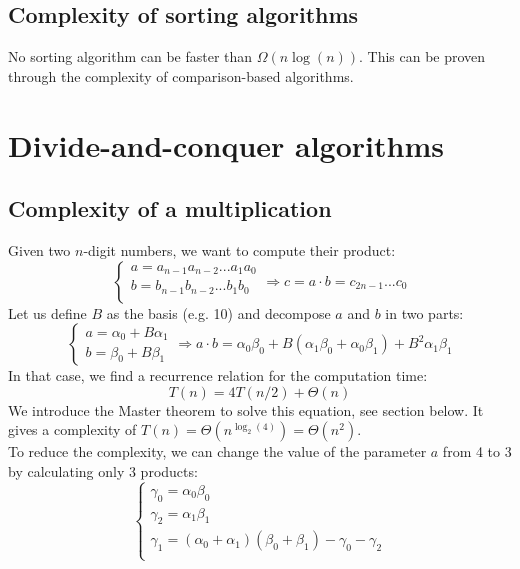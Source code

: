 \documentclass[12pt, openany]{report}
\theoremstyle{definition}
\begin{document}
\section{Complexity of sorting algorithms}
No sorting algorithm can be faster than $\Omega(n \log(n))$. This can be proven through the complexity of comparison-based algorithms. 
\chapter{Divide-and-conquer algorithms}
\section{Complexity of a multiplication}
Given two $n$-digit numbers, we want to compute their product:
\begin{equation}
  	\begin{cases}
		a = a_{n-1}a_{n-2}...a_1a_0\\
		b = b_{n-1}b_{n-2}...b_1b_0\\
  	\end{cases}
	\Longrightarrow c=a\cdot b = c_{2n-1}...c_0
\end{equation}
Let us define $B$ as the basis (e.g. 10) and decompose $a$ and $b$ in two parts:
\begin{equation}
	\begin{cases}
		a = \alpha_0+B\alpha_1\\
		b = \beta_0+B\beta_1
	\end{cases} \Longrightarrow a\cdot b = \alpha_0\beta_0 + B(\alpha_1\beta_0 + \alpha_0\beta_1)+B^2 \alpha_1\beta_1
\end{equation}
In that case, we find a recurrence relation for the computation time:
\begin{equation}
	T(n) = 4T(n/2) + \Theta(n)
\end{equation}
We introduce the Master theorem to solve this equation, see section below. It gives a complexity of $T(n) = \Theta(n^{\log_2(4)}) = \Theta(n^2)$.\\
To reduce the complexity, we can change the value of the parameter $a$ from 4 to 3 by calculating only 3 products:
\begin{equation}
	\begin{cases}
		\gamma_0 = \alpha_0\beta_0\\
		\gamma_2 = \alpha_1\beta_1\\
		\gamma_1 = (\alpha_0+\alpha_1)(\beta_0+\beta_1)-\gamma_0-\gamma_2\\
	\end{cases}
\end{equation}
\end{document}
